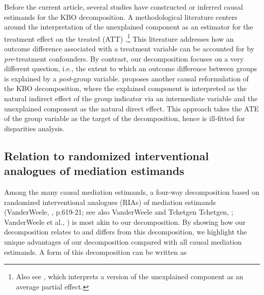 \documentclass[12pt,a4paper]{article}
\begin{document}
Before the current article, several studies have constructed or inferred causal estimands for the KBO decomposition. A methodological literature centers around the interpretation of the unexplained component as an estimator for the treatment effect on the treated (ATT) \citep{dinardo_labor_1996, kline_oaxaca-blinder_2011, yamaguchi_decomposition_2015}.\footnote{Also see \citet{chernozhukov_sorted_2018}, which interprets a version of the unexplained component as an average partial effect.} This literature addresses how an outcome difference associated with a treatment variable can be accounted for by \emph{pre}-treatment confounders. By contrast, our decomposition focuses on a very different question, i.e., the extent to which an outcome difference between groups is explained by a \emph{post}-group variable. \citet{huber_causal_2015} proposes another causal reformulation of the KBO decomposition, where the explained component is interpreted as the natural indirect effect of the group indicator via an intermediate variable and the unexplained component as the natural direct effect. This approach takes the ATE of the group variable as the target of the decomposition, hence is ill-fitted for disparities analysis.

\subsection{Relation to randomized interventional analogues of mediation estimands}
Among the many causal mediation estimands, a four-way decomposition based on randomized interventional analogues (RIAs) of mediation estimands (VanderWeele,  \citeyear{vanderweele_explanation_2015}, p.619-21; see also VanderWeele and Tchetgen Tchetgen, \citeyear{vanderweele_mediation_2017}; VanderWeele et al., \citeyear{vanderweele_effect_2014}) is most akin to our decomposition. By showing how our decomposition relates to and differs from this decomposition, we highlight the unique advantages of our decomposition compared with all causal mediation estimands. A form of this decomposition can be written as 
\end{document}
